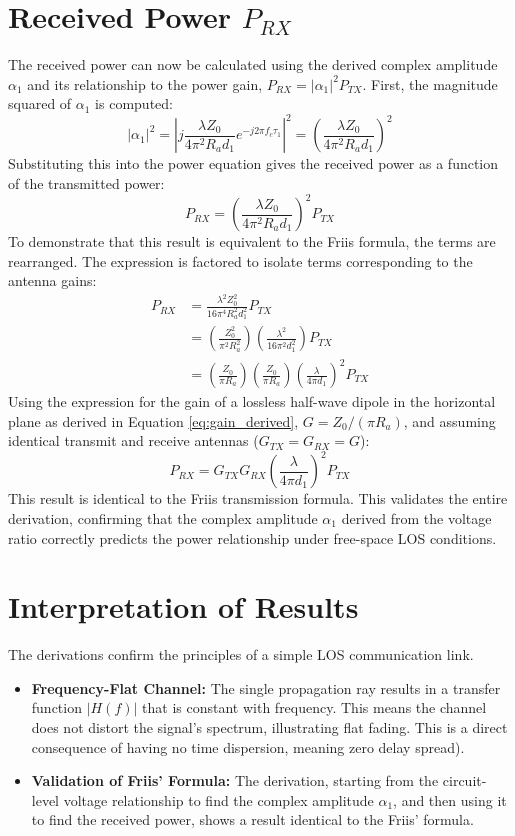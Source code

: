 \section{Received Power $P_{RX}$}
The received power can now be calculated using the derived complex amplitude $\alpha_1$ and its relationship to the power gain, $P_{RX} = |\alpha_1|^2 P_{TX}$. First, the magnitude squared of $\alpha_1$ is computed:
\begin{equation}
	|\alpha_1|^2 = \left| j \frac{\lambda Z_0}{4\pi^2 R_a d_1} e^{-j2\pi f_c \tau_1} \right|^2 = \left( \frac{\lambda Z_0}{4\pi^2 R_a d_1} \right)^2
\end{equation}
Substituting this into the power equation gives the received power as a function of the transmitted power:
\begin{equation}
	\boxed{P_{RX} = \left( \frac{\lambda Z_0}{4\pi^2 R_a d_1} \right)^2 P_{TX}}
\end{equation}
To demonstrate that this result is equivalent to the Friis formula, the terms are rearranged. The expression is factored to isolate terms corresponding to the antenna gains:
\begin{align}
	P_{RX} &= \frac{\lambda^2 Z_0^2}{16\pi^4 R_a^2 d_1^2} P_{TX} \\
	&= \left( \frac{Z_0^2}{\pi^2 R_a^2} \right) \left( \frac{\lambda^2}{16\pi^2 d_1^2} \right) P_{TX} \\
	&= \left( \frac{Z_0}{\pi R_a} \right) \left( \frac{Z_0}{\pi R_a} \right) \left( \frac{\lambda}{4\pi d_1} \right)^2 P_{TX}
\end{align}
Using the expression for the gain of a lossless half-wave dipole in the horizontal plane as derived in Equation \eqref{eq:gain_derived}, $G = Z_0/(\pi R_a)$, and assuming identical transmit and receive antennas ($G_{TX} = G_{RX} = G$):
\begin{equation}
	P_{RX} = G_{TX} G_{RX} \left( \frac{\lambda}{4\pi d_1} \right)^2 P_{TX} \label{eq:los_power_final_detailed}
\end{equation}
This result is identical to the Friis transmission formula. This validates the entire derivation, confirming that the complex amplitude $\alpha_1$ derived from the voltage ratio correctly predicts the power relationship under free-space LOS conditions.

\section{Interpretation of Results}
The derivations confirm the principles of a simple LOS communication link.
\begin{itemize}
	\item \textbf{Frequency-Flat Channel:} The single propagation ray results in a transfer function $|H(f)|$ that is constant with frequency. This means the channel does not distort the signal's spectrum, illustrating flat fading. This is a direct consequence of having no time dispersion, meaning zero delay spread).
	\item \textbf{Validation of Friis' Formula:} The derivation, starting from the circuit-level voltage relationship to find the complex amplitude $\alpha_1$, and then using it to find the received power, shows a result identical to the Friis' formula.
\end{itemize}
